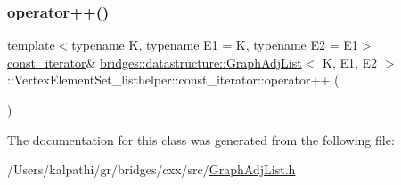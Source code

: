 \subsubsection{\texorpdfstring{operator++()}{operator++()}}
{\footnotesize\ttfamily template$<$typename K, typename E1 = K, typename E2 = E1$>$ \\
\mbox{\hyperlink{classbridges_1_1datastructure_1_1_graph_adj_list_1_1_vertex_element_set__listhelper_1_1const__iterator}{const\+\_\+iterator}}\& \mbox{\hyperlink{classbridges_1_1datastructure_1_1_graph_adj_list}{bridges\+::datastructure\+::\+Graph\+Adj\+List}}$<$ K, E1, E2 $>$\+::Vertex\+Element\+Set\+\_\+listhelper\+::const\+\_\+iterator\+::operator++ (\begin{DoxyParamCaption}{ }\end{DoxyParamCaption})\hspace{0.3cm}{\ttfamily [inline]}}



The documentation for this class was generated from the following file\+:\begin{DoxyCompactItemize}
\item 
/\+Users/kalpathi/gr/bridges/cxx/src/\mbox{\hyperlink{_graph_adj_list_8h}{Graph\+Adj\+List.\+h}}\end{DoxyCompactItemize}
